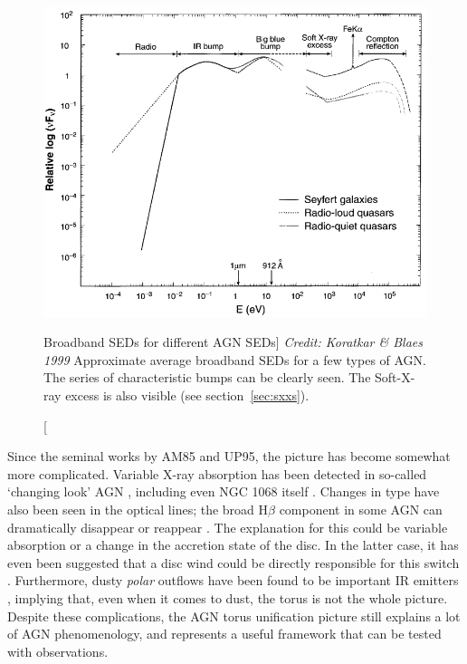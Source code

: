 \nocite{elvis1994}
\begin{figure}
\centering
\includegraphics[width=1.0\textwidth]{figures/01-intro/agn_sed.png}
\caption
[Broadband SEDs for different AGN SEDs]
{
{\sl Credit: Koratkar \& Blaes 1999}
Approximate average broadband SEDs for a few types of AGN. The series of 
characteristic bumps can be clearly seen. 
The Soft-X-ray excess is also visible
(see section~\ref{sec:sxxs}).
} 
\label{fig:quasar_sed}
\end{figure}

Since the seminal works by AM85 and UP95, 
the picture has become somewhat more complicated. 
Variable X-ray absorption has been detected in so-called `changing look'
AGN \citep{matt2003,puccetti2007}, including even NGC 1068 itself \citep{marinucci2016}.
Changes in type have also been seen in the optical lines; 
the broad H$\beta$ component in some AGN can dramatically disappear or reappear
\citep[e.g.][]{tohline1976,cohen1986,denney2014}. 
The explanation for this could be variable absorption \citep{elitzur2012}
or a change in the accretion state of the disc. In the latter case,
it has even been suggested that a disc wind could be directly responsible
for this switch \citep{elitzur2014}.
Furthermore, dusty {\em polar} outflows
have been found to be important IR emitters \citep{hoenig2013}, implying
that, even when it comes to dust, the torus is not the whole picture.
Despite these complications, the AGN torus unification picture still
explains a lot of AGN phenomenology, and represents a useful framework 
that can be tested with observations. 


